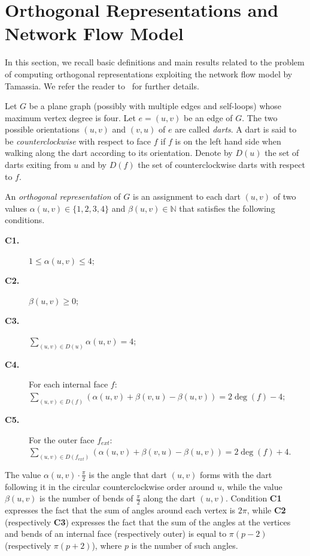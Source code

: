 \documentclass{article}
\newcommand{\p}{\pi}
\newcommand{\ph}{\frac{\pi}{2}}
\begin{document}
{\small }


\clearpage{}\appendix

\clearpage

\renewcommand\thesection{\Alph{section}}


\section{Orthogonal Representations and Network Flow Model}\label{ap:orthorep-flow}

In this section, we recall basic definitions and main results related to the problem of computing orthogonal representations exploiting the network flow model by Tamassia. We refer the reader to~\cite{dett-gdavg-99,Garg1997} for further details.

Let $G$ be a plane graph (possibly with multiple edges and self-loops) whose maximum vertex degree is four. Let $e=(u,v)$ be an edge of $G$. The two possible orientations $(u,v)$ and $(v,u)$ of $e$ are called \emph{darts}. A dart is said to be \emph{counterclockwise} with respect to face $f$ if $f$ is on the left hand side when walking along the dart according to its orientation. Denote by $D(u)$ the set of darts exiting from $u$ and by $D(f)$ the set of counterclockwise darts with respect to $f$. 

An \emph{orthogonal representation} of $G$ is an assignment to each dart $(u,v)$ of two values $\alpha(u,v) \in \{1,2,3,4\}$ and $\beta(u,v) \in \mathbb{N}$  that satisfies the following conditions.

\begin{description}
\item[\bf C1.] $1 \leq \alpha(u,v) \leq 4$;
\item[\bf C2.] $\beta(u,v) \geq 0$;
\item[\bf C3.] $\sum_{(u,v) \in D(u)}\alpha(u,v)=4$;
\item[\bf C4.] For each internal face $f$: $\sum_{(u,v) \in D(f)}(\alpha(u,v)+\beta(v,u)-\beta(u,v))=2\deg(f)-4$;
\item[\bf C5.] For the outer face $f_{ext}$: $\sum_{(u,v) \in D(f_{ext})}(\alpha(u,v)+\beta(v,u)-\beta(u,v))=2\deg(f)+4$.
\end{description}

The value $\alpha(u,v)\cdot \ph$ is the angle that dart $(u,v)$ forms with the dart following it in the circular counterclockwise order around $u$, while the value $\beta(u,v)$ is the number of bends of $\ph$ along the dart $(u,v)$. Condition {\bf C1} expresses the fact that the sum of angles around each vertex is $2\p$, while  {\bf C2} (respectively {\bf C3}) expresses the fact that the sum of the angles at the vertices and bends of an internal face (respectively outer) is equal to $\pi (p-2)$ (respectively $\pi (p+2)$), where $p$ is the number of such angles.
\end{document}
